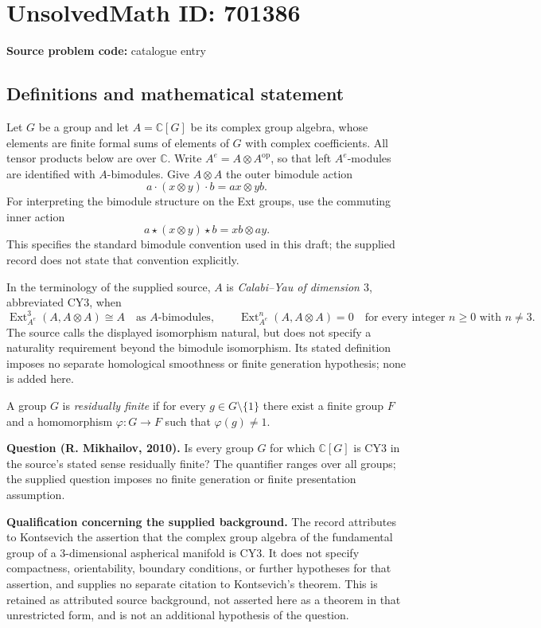 \documentclass[11pt]{article}
\newcommand{\C}{\mathbb{C}}
\begin{document}
\section*{UnsolvedMath ID: 701386}
\textbf{Source problem code:} catalogue entry
\subsection{Definitions and mathematical statement}
Let \(G\) be a group and let \(A=\C[G]\) be its complex group algebra, whose elements are finite formal sums of elements of \(G\) with complex coefficients. All tensor products below are over \(\C\). Write \(A^e=A\otimes A^{\mathrm{op}}\), so that left \(A^e\)-modules are identified with \(A\)-bimodules. Give \(A\otimes A\) the outer bimodule action
\[
a\cdot(x\otimes y)\cdot b=ax\otimes yb.
\]
For interpreting the bimodule structure on the Ext groups, use the commuting inner action
\[
a\mathbin{\star}(x\otimes y)\mathbin{\star}b=xb\otimes ay.
\]
This specifies the standard bimodule convention used in this draft; the supplied record does not state that convention explicitly.

In the terminology of the supplied source, \(A\) is \emph{Calabi--Yau of dimension \(3\)}, abbreviated CY\(3\), when
\[
\operatorname{Ext}^{3}_{A^e}(A,A\otimes A)\cong A
\quad\text{as \(A\)-bimodules},
\qquad
\operatorname{Ext}^{n}_{A^e}(A,A\otimes A)=0
\quad\text{for every integer }n\geq 0\text{ with }n\ne 3.
\]
The source calls the displayed isomorphism natural, but does not specify a naturality requirement beyond the bimodule isomorphism. Its stated definition imposes no separate homological smoothness or finite generation hypothesis; none is added here.

A group \(G\) is \emph{residually finite} if for every \(g\in G\setminus\{1\}\) there exist a finite group \(F\) and a homomorphism \(\varphi:G\to F\) such that \(\varphi(g)\ne 1\).

\textbf{Question (R. Mikhailov, 2010).} Is every group \(G\) for which \(\C[G]\) is CY\(3\) in the source's stated sense residually finite? The quantifier ranges over all groups; the supplied question imposes no finite generation or finite presentation assumption.

\textbf{Qualification concerning the supplied background.} The record attributes to Kontsevich the assertion that the complex group algebra of the fundamental group of a \(3\)-dimensional aspherical manifold is CY\(3\). It does not specify compactness, orientability, boundary conditions, or further hypotheses for that assertion, and supplies no separate citation to Kontsevich's theorem. This is retained as attributed source background, not asserted here as a theorem in that unrestricted form, and is not an additional hypothesis of the question.
\end{document}
